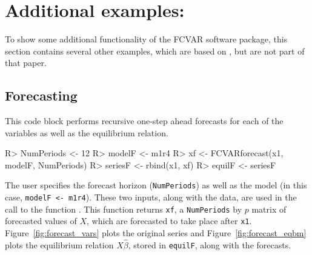 \documentclass[article]{jss}
\newcommand{\fct}[1]{\code{#1()}}
\begin{document}
\section[Additional examples: MoreExamples.R]{Additional examples: }
\label{sec:examples}

To show some additional functionality of the FCVAR software package, this section contains several other examples, which are based on \cite{JNP2014}, but are not part of that paper.

\subsection{Forecasting}
\label{sec:forecasting}

This code block 
performs recursive one-step ahead forecasts for each of the variables as well as the equilibrium relation. 
%
%
\begin{Code}
R> NumPeriods <- 12
R> modelF <- m1r4
R> xf <- FCVARforecast(x1, modelF, NumPeriods)
R> seriesF <- rbind(x1, xf) 
R> equilF <- seriesF %
\end{Code}
%
%
%
The user specifies the forecast horizon (\verb|NumPeriods|) as well as the model (in this case, \verb|modelF <- m1r4|). These two inputs, along with the data, are used in the call to the function \fct{FCVARforecast}. This function returns \verb|xf|, a \verb|NumPeriods| by $p$ matrix of forecasted values of $X$, 
which are forecasted to take place after \verb|x1|. 
Figure~\ref{fig:forecast_vars} plots the original series and Figure~\ref{fig:forecast_eqbm} plots the equilibrium relation $X\hat{\beta}$, stored in \verb|equilF|,  along with the forecasts. 
\end{document}
